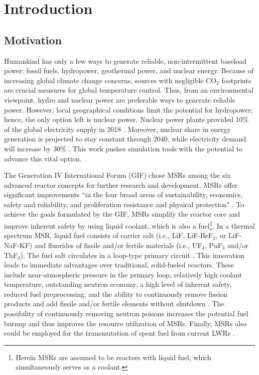 \chapter{Introduction}
\section{Motivation}
Humankind has only a few ways to generate reliable, non-intermittent baseload 
power: fossil fuels, hydropower, geothermal power, and nuclear energy. 
Because of increasing global climate change concerns, sources with negligible 
CO$_2$ footprints are crucial measures for global temperature control. Thus, 
from an environmental viewpoint, hydro and nuclear power are preferable ways 
to generate reliable power. However,  local geographical conditions limit the 
potential for hydropower; hence, the only option left is nuclear power. 
Nuclear power plants provided 10\% of the global electricity supply in 2018 
\cite{iea_nuclear_2019}. Moreover, nuclear share in energy generation is 
projected to stay constant through 2040, while electricity demand will 
increase by 30\% \cite{noauthor_world_2017}. This work pushes simulation tools 
with the potential to advance this vital option.

The Generation IV International Forum (GIF) chose \glspl{MSR} among the six 
advanced reactor concepts for further research and development. \glspl{MSR} 
offer significant improvements ``in the four broad areas of sustainability, 
economics, safety and reliability, and proliferation resistance and physical 
protection" \cite{doe_technology_2002}. To achieve the goals formulated by the 
GIF, \glspl{MSR} simplify the reactor core and improve inherent safety by 
using liquid coolant, which is also a fuel\footnote{Herein \glspl{MSR} are 
assumed to be reactors with liquid fuel, which simultaneously serves as a 
coolant.}. In a thermal spectrum \gls{MSR}, liquid fuel consists of carrier 
salt (i.e., LiF, LiF-BeF$_2$, or LiF-NaF-KF) and fluorides of fissile and/or 
fertile materials (i.e., UF$_4$, PuF$_3$ and/or ThF$_4$). The fuel salt 
circulates in a loop-type primary circuit \cite{haubenreich_experience_1970}. 
This innovation leads to immediate advantages over traditional, solid-fueled 
reactors. These include near-atmospheric pressure in the primary loop, 
relatively high coolant temperature, outstanding neutron economy, a high level 
of inherent safety, reduced fuel preprocessing, and the ability to 
continuously remove fission products and add fissile and/or fertile elements 
without shutdown \cite{leblanc_molten_2010}. The possibility of continuously 
removing neutron poisons increases the potential fuel burnup and thus 
improves the resource utilization of \glspl{MSR}. Finally, \glspl{MSR} 
also could be employed for the transmutation of spent fuel from current 
\glspl{LWR} \cite{fratoni_design_2004}.

